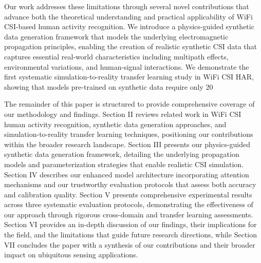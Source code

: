 \documentclass[journal]{IEEEtran}
\begin{document}
Our work addresses these limitations through several novel contributions that advance both the theoretical understanding and practical applicability of WiFi CSI-based human activity recognition. We introduce a physics-guided synthetic data generation framework that models the underlying electromagnetic propagation principles, enabling the creation of realistic synthetic CSI data that captures essential real-world characteristics including multipath effects, environmental variations, and human-signal interactions. We demonstrate the first systematic simulation-to-reality transfer learning study in WiFi CSI HAR, showing that models pre-trained on synthetic data require only 20%

The remainder of this paper is structured to provide comprehensive coverage of our methodology and findings. Section II reviews related work in WiFi CSI human activity recognition, synthetic data generation approaches, and simulation-to-reality transfer learning techniques, positioning our contributions within the broader research landscape. Section III presents our physics-guided synthetic data generation framework, detailing the underlying propagation models and parameterization strategies that enable realistic CSI simulation. Section IV describes our enhanced model architecture incorporating attention mechanisms and our trustworthy evaluation protocols that assess both accuracy and calibration quality. Section V presents comprehensive experimental results across three systematic evaluation protocols, demonstrating the effectiveness of our approach through rigorous cross-domain and transfer learning assessments. Section VI provides an in-depth discussion of our findings, their implications for the field, and the limitations that guide future research directions, while Section VII concludes the paper with a synthesis of our contributions and their broader impact on ubiquitous sensing applications.
\end{document}
